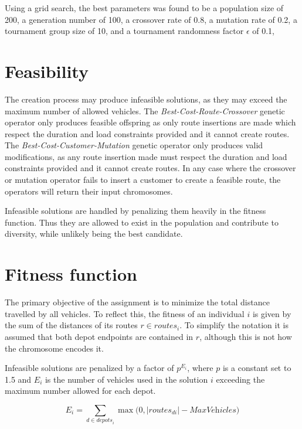 \documentclass[paper=a4, fontsize=9pt]{scrartcl}
\begin{document}
\begin{multicols}{2}
Using a grid search, the best parameters was found to be a population size of 200, a generation number of 100, a crossover rate of 0.8, a mutation rate of 0.2, a tournament group size of 10, and a tournament randomness factor $\epsilon$ of 0.1, 

\section*{Feasibility}

The creation process may produce infeasible solutions, as they may exceed the maximum number of allowed vehicles. The \textit{Best-Cost-Route-Crossover} genetic operator only produces feasible offspring as only route insertions are made which respect the duration and load constraints provided and it cannot create routes. The \textit{Best-Cost-Customer-Mutation} genetic operator only produces valid modifications, as any route insertion made must respect the duration and load constraints provided and it cannot create routes. In any case where the crossover or mutation operator fails to insert a customer to create a feasible route, the operators will return their input chromosomes.

Infeasible solutions are handled by penalizing them heavily in the fitness function. Thus they are allowed to exist in the population and contribute to diversity, while unlikely being the best candidate.

\section*{Fitness function}

The primary objective of the assignment is to minimize the total distance travelled by all vehicles. To reflect this, the fitness of an individual $i$ is given by the sum of the distances of its routes $r \in \textit{routes}_i$. To simplify the notation it is assumed that both depot endpoints are contained in $r$, although this is not how the chromosome encodes it.

Infeasible solutions are penalized by a factor of $p^{E_i}$, where $p$ is a constant set to 1.5 and $E_i$ is the number of vehicles used in the solution $i$ exceeding the maximum number allowed for each depot.

\begin{equation}
E_i = \sum_{d \in \textit{depots}_i} \max \big(0, \vert \textit{routes}_{di} \vert - \textit{MaxVehicles} \big)
\end{equation}


\end{multicols}
\end{document}
